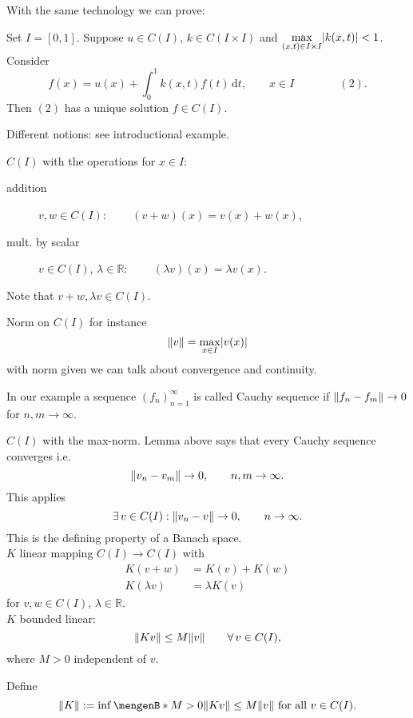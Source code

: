 With the same technology we can prove:
\begin{theorem}
	Set $I = [0,1]$. Suppose $u \in C(I)$, $k \in C(I \times I)$ and $\max\limits_{(x,t) \in I \times I} \lvert k(x,t)\rvert <1$. Consider \[
		f(x) = u(x) + \int_{0}^{1}k(x,t)f(t) \,\mathrm{d}t, \qquad x \in I \qquad \qquad (2).
	\]
	Then $(2)$ has a unique solution $f \in C(I)$.
\end{theorem}
Different notions: see introductional example.
\begin{definition*}
	$C(I)$ with the operations for $x \in I$:
	\begin{description}
		\item[addition] $v,w \in C(I)$: $\qquad (v+w)(x) = v(x)+ w(x)$, 
		\item[mult. by scalar] $v \in C(I)$, $ \lambda \in \mathbb{R}$: $\qquad (\lambda v)(x) = \lambda v(x)$.
	\end{description}
	Note that $v+w, \lambda v \in C(I)$.
\end{definition*}
\begin{definition*}[norm]
	Norm on $C(I)$ for instance 
	\[
		\norm{v} = \max_{x \in I} \abs{v(x)}
	\]
	with norm given we can talk about convergence and continuity.
\end{definition*}
\begin{definition*}
	In our example a sequence $(f_n)_{n=1}^{\infty}$ is called Cauchy sequence if $\norm{f_n-f_m} \to 0$ for $n,m \to \infty$.
\end{definition*}
\begin{definition*}
	$C(I)$ with the max-norm. Lemma above says that every Cauchy sequence converges i.e.
	\[
		\norm{v_n-v_m} \to 0, \qquad n,m \to \infty.
	\]
	This applies
	\[
		\exists\, v \in C(I): \norm{v_n-v} \to 0, \qquad n \to \infty.
	\]
	This is the defining property of a Banach space. \\
	$K$ linear mapping $C(I) \to C(I)$ with
	\begin{align*}
		K(v+w) &= K(v) + K(w) \\
		K(\lambda v) &= \lambda K(v)
	\end{align*}
	for $v,w \in  C(I)$, $\lambda \in \mathbb{R}$. \\
	$K$ bounded linear:
	\[
		\norm{Kv} \leq M \norm{v} \qquad \forall\, v \in C(I),
	\]
	where $M >0$ independent of $v$.	
\end{definition*}
\begin{definition*}
	Define
	\[
		\norm{K}:= \inf \set[M>0]{\norm{Kv} \leq M \norm{v} \text{ for all }v \in C(I)}.
	\]
\end{definition*}
